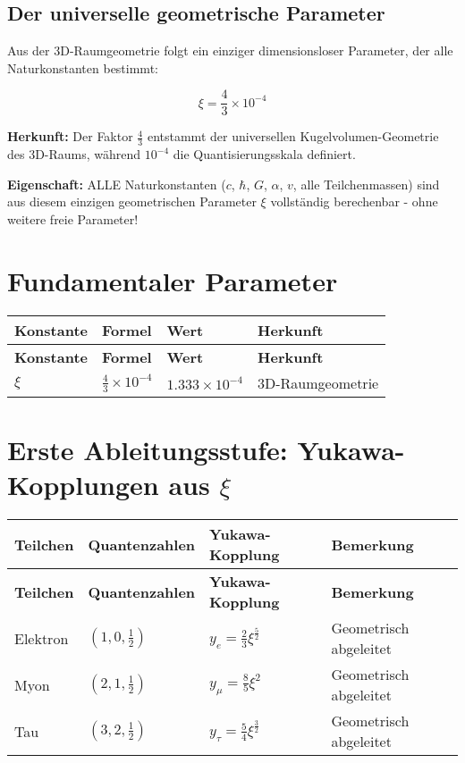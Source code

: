 \documentclass[12pt,a4paper]{article}
\begin{document}
	\subsection{Der universelle geometrische Parameter}
	
	Aus der 3D-Raumgeometrie folgt ein einziger dimensionsloser Parameter, der alle Naturkonstanten bestimmt:
	
	\begin{equation}
		\boxed{\xi = \frac{4}{3} \times 10^{-4}}
	\end{equation}
	
	\textbf{Herkunft:} Der Faktor $\frac{4}{3}$ entstammt der universellen Kugelvolumen-Geometrie des 3D-Raums, während $10^{-4}$ die Quantisierungsskala definiert.
	
	\textbf{Eigenschaft:} ALLE Naturkonstanten ($c$, $\hbar$, $G$, $\alpha$, $v$, alle Teilchenmassen) sind aus diesem einzigen geometrischen Parameter $\xi$ vollständig berechenbar - ohne weitere freie Parameter!
	

	\section{Fundamentaler Parameter}
	
	\begin{longtable}{|p{3cm}|p{4cm}|p{3cm}|p{4cm}|}
		\hline
		\textbf{Konstante} & \textbf{Formel} & \textbf{Wert} & \textbf{Herkunft} \\
		\hline
		\endfirsthead
		\hline
		\textbf{Konstante} & \textbf{Formel} & \textbf{Wert} & \textbf{Herkunft} \\
		\hline
		\endhead
		\(\xi\) & \(\frac{4}{3} \times 10^{-4}\) & \(1.333 \times 10^{-4}\) & 3D-Raumgeometrie \\
		\hline
	\end{longtable}
	
	\section{Erste Ableitungsstufe: Yukawa-Kopplungen aus \(\xi\)}
	
	\begin{longtable}{|p{2.5cm}|p{3cm}|p{4cm}|p{4cm}|}
		\hline
		\textbf{Teilchen} & \textbf{Quantenzahlen} & \textbf{Yukawa-Kopplung} & \textbf{Bemerkung} \\
		\hline
		\endfirsthead
		\hline
		\textbf{Teilchen} & \textbf{Quantenzahlen} & \textbf{Yukawa-Kopplung} & \textbf{Bemerkung} \\
		\hline
		\endhead
		Elektron & \((1,0,\frac{1}{2})\) & \(y_e = \frac{2}{3}\xi^{\frac{5}{2}}\) & Geometrisch abgeleitet \\
		\hline
		Myon & \((2,1,\frac{1}{2})\) & \(y_{\mu} = \frac{8}{5}\xi^{2}\) & Geometrisch abgeleitet \\
		\hline
		Tau & \((3,2,\frac{1}{2})\) & \(y_{\tau} = \frac{5}{4}\xi^{\frac{3}{2}}\) & Geometrisch abgeleitet \\
		\hline
	\end{longtable}
	
\end{document}
